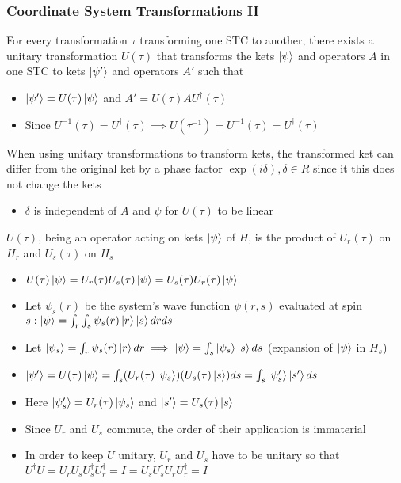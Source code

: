 \documentclass[8pt,t,mathserif,aspectratio=169]{beamer}
\begin{document}
\begin{frame}
  \frametitle{Coordinate System Transformations II}
  \vspace{1mm}
  For every transformation $\tau$ transforming one STC to another, there exists a unitary transformation $U(\tau)$ that transforms the kets $\ket{\psi}$ and operators $A$ in one STC to kets $\ket{\psi'}$ and operators $A'$ such that
  \begin{itemize}
    \item $\ket{\psi'} = U(\tau) \ket{\psi}$ and $A' = U(\tau) A U^{\dagger}(\tau)$
    \item Since $U^{-1}(\tau) = U^{\dagger}(\tau) \implies U(\tau^{-1}) = U^{-1}(\tau) = U^{\dagger}(\tau)$
  \end{itemize}
  When using unitary transformations to transform kets, the transformed ket can differ from the original ket by a phase factor $\exp(i \delta), \delta \in R$ since it this does not change the kets 
  \begin{itemize}
    \item $\delta$ is independent of $A$ and $\psi$ for $U(\tau)$ to be linear
  \end{itemize}
  $U(\tau)$, being an operator acting on kets $\ket{\psi}$ of $H$, is the product of $U_r(\tau)$ on $H_r$ and $U_s(\tau)$ on $H_s$
  \begin{itemize}
    \item $U(\tau) \ket{\psi} = U_r(\tau) U_s(\tau) \ket{\psi} = U_s(\tau) U_r(\tau) \ket{\psi}$
    \item Let $\psi_s(r)$ be the system's wave function $\psi(r,s)$ evaluated at spin $s: \ket{\psi} = \int_r \int_s \psi_s(r) \ket{r} \ket{s} dr ds$
    \item Let $\ket{\psi_s} = \int_r \psi_s(r) \ket{r} dr \implies \ket{\psi} = \int_s \ket{\psi_s} \ket{s} ds$ (expansion of $\ket{\psi}$ in $H_s$)
    \item $\ket{\psi'} = U(\tau) \ket{\psi} = \int_s (U_r(\tau) \ket{\psi_s}) (U_s(\tau) \ket{s}) ds = \int_s \ket{\psi'_s} \ket{s'} ds$
    \item Here $\ket{\psi'_s} = U_r(\tau) \ket{\psi_s}$ and $\ket{s'} = U_s(\tau) \ket{s}$
    \item Since $U_r$ and $U_s$ commute, the order of their application is immaterial
    \item In order to keep $U$ unitary, $U_r$ and $U_s$ have to be unitary so that $U^{\dagger} U = U_r U_s U^{\dagger}_s U^{\dagger}_r = I = U_s U^{\dagger}_s U_r U^{\dagger}_r = I$
  \end{itemize}
\end{frame}
\end{document}

